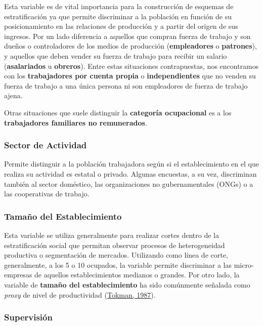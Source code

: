 \documentclass[
]{article}
\begin{document}
Esta variable es de vital importancia para la construcción de esquemas de estratificación ya que permite discriminar a la población en función de su posicionamiento en las relaciones de producción y a partir del origen de sus ingresos. Por un lado diferencia a aquellos que compran fuerza de trabajo y son dueños o controladores de los medios de producción (\textbf{empleadores} o \textbf{patrones}), y aquellos que deben vender su fuerza de trabajo para recibir un salario (\textbf{asalariados} u \textbf{obreros}). Entre estas situaciones contrapuestas, nos encontramos con los \textbf{trabajadores por cuenta propia} o \textbf{independientes} que no venden su fuerza de trabajo a una única persona ni son empleadores de fuerza de trabajo ajena.

Otras situaciones que suele distinguir la \textbf{categoría ocupacional} es a los \textbf{trabajadores familiares no remunerados}.

\hypertarget{sector-de-actividad}{%
\subsubsection{Sector de Actividad}\label{sector-de-actividad}}

Permite distinguir a la población trabajadora según si el establecimiento en el que realiza su actividad es estatal o privado. Algunas encuestas, a su vez, discriminan también al sector doméstico, las organizaciones no gubernamentales (ONGs) o a las cooperativas de trabajo.

\hypertarget{tamauxf1o-del-establecimiento}{%
\subsubsection{Tamaño del Establecimiento}\label{tamauxf1o-del-establecimiento}}

Esta variable se utiliza generalmente para realizar cortes dentro de la estratificación social que permitan observar procesos de heterogeneidad productiva o segmentación de mercados. Utilizando como línea de corte, generalmente, a los 5 o 10 ocupados, la variable permite discriminar a las micro-empresas de aquellos establecimientos medianos o grandes. Por otro lado, la variable de \textbf{tamaño del establecimiento} ha sido comúnmente señalada como \emph{proxy} de nivel de productividad (\protect\hyperlink{ref-Tokman1987}{Tokman, 1987}).

\hypertarget{supervisiuxf3n}{%
\subsubsection{Supervisión}\label{supervisiuxf3n}}
\end{document}
